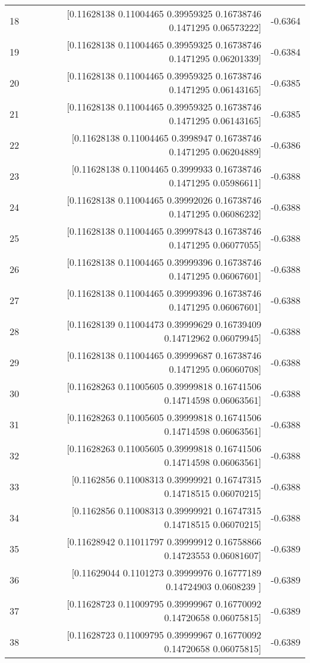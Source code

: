 \begin{longtable}{lrr}
18 & [0.11628138 0.11004465 0.39959325 0.16738746 0.1471295  0.06573222] & -0.6364 \\
19 & [0.11628138 0.11004465 0.39959325 0.16738746 0.1471295  0.06201339] & -0.6384 \\
20 & [0.11628138 0.11004465 0.39959325 0.16738746 0.1471295  0.06143165] & -0.6385 \\
21 & [0.11628138 0.11004465 0.39959325 0.16738746 0.1471295  0.06143165] & -0.6385 \\
22 & [0.11628138 0.11004465 0.3998947  0.16738746 0.1471295  0.06204889] & -0.6386 \\
23 & [0.11628138 0.11004465 0.3999933  0.16738746 0.1471295  0.05986611] & -0.6388 \\
24 & [0.11628138 0.11004465 0.39992026 0.16738746 0.1471295  0.06086232] & -0.6388 \\
25 & [0.11628138 0.11004465 0.39997843 0.16738746 0.1471295  0.06077055] & -0.6388 \\
26 & [0.11628138 0.11004465 0.39999396 0.16738746 0.1471295  0.06067601] & -0.6388 \\
27 & [0.11628138 0.11004465 0.39999396 0.16738746 0.1471295  0.06067601] & -0.6388 \\
28 & [0.11628139 0.11004473 0.39999629 0.16739409 0.14712962 0.06079945] & -0.6388 \\
29 & [0.11628138 0.11004465 0.39999687 0.16738746 0.1471295  0.06060708] & -0.6388 \\
30 & [0.11628263 0.11005605 0.39999818 0.16741506 0.14714598 0.06063561] & -0.6388 \\
31 & [0.11628263 0.11005605 0.39999818 0.16741506 0.14714598 0.06063561] & -0.6388 \\
32 & [0.11628263 0.11005605 0.39999818 0.16741506 0.14714598 0.06063561] & -0.6388 \\
33 & [0.1162856  0.11008313 0.39999921 0.16747315 0.14718515 0.06070215] & -0.6388 \\
34 & [0.1162856  0.11008313 0.39999921 0.16747315 0.14718515 0.06070215] & -0.6388 \\
35 & [0.11628942 0.11011797 0.39999912 0.16758866 0.14723553 0.06081607] & -0.6389 \\
36 & [0.11629044 0.1101273  0.39999976 0.16777189 0.14724903 0.0608239 ] & -0.6389 \\
37 & [0.11628723 0.11009795 0.39999967 0.16770092 0.14720658 0.06075815] & -0.6389 \\
38 & [0.11628723 0.11009795 0.39999967 0.16770092 0.14720658 0.06075815] & -0.6389 \\

\end{longtable}
